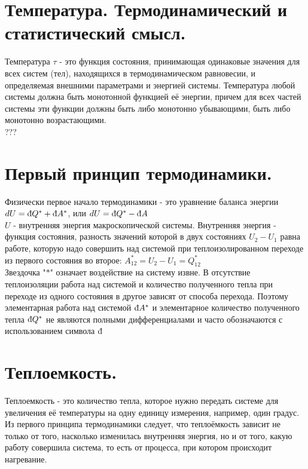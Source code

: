 \begin{multicols*}{2}
		\section{Температура. Термодинамический и статистический смысл.}
		Температура $\tau$ - это функция состояния, принимающая одинаковые значения для всех систем (тел), находящихся в термодинамическом равновесии, и определяемая внешними параметрами и энергией системы. Температура любой системы должна быть монотонной функцией её энергии, причем для всех частей системы эти функции должны быть либо монотонно убывающими, быть либо монотонно возрастающими.\\
		???

		\section{Первый принцип термодинамики.}
		Физически первое начало термодинамики - это уравнение баланса энергии\\
		$dU = \text{\dj}Q^* + \text{\dj}A^*$, или $dU = \text{\dj}Q^* - \text{\dj}A$\\
		$U$ - внутренняя энергия макроскопической системы. Внутренняя энергия - функция состояния, разность значений которой в двух состояниях $U_2 - U_1$ равна работе, которую надо совершить над системой при теплоизолированном переходе из первого состояния во второе: $A^*_{12} = U_2 - U_1 = Q^*_{12}$\\
		Звездочка "$*$" означает воздействие на систему извне. В отсутствие теплоизоляции работа над системой и количество полученного тепла при переходе из одного состояния в другое зависят от способа перехода. Поэтому элементарная работа над системой $\text{\dj}A^*$ и элементарное количество полученного тепла $\text{\dj}Q^*$ не являются полными дифференциалами и часто обозначаются с использованием символа $\text{\dj}$

		\section{Теплоемкость.}
		Теплоемкость - это количество тепла, которое нужно передать системе для увеличения её температуры на одну единицу измерения, например, один градус. Из первого принципа термодинамики следует, что теплоёмкость зависит не только от того, насколько изменилась внутренняя энергия, но и от того, какую работу совершила система, то есть от процесса, при котором происходит нагревание.


\end{multicols*}
